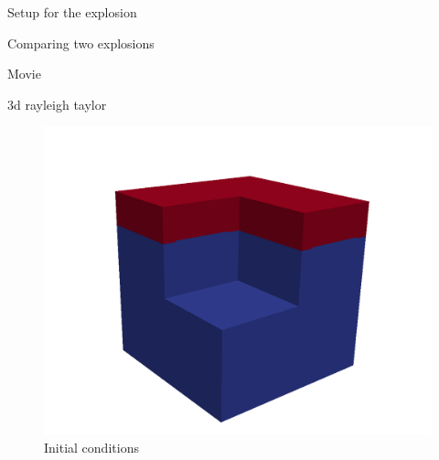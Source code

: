 \begin{frame}{Setup for the explosion}
\begin{minipage}{0.3\textwidth}
\begin{block}{}
\begin{figure}
        	  					\end{figure}
        	  		  	\end{block}
        	  	\end{minipage}
\end{frame}

\begin{frame}{Comparing two explosions}

Movie

\end{frame}


\begin{frame}{3d rayleigh taylor}

\vspace{2cm}
        	  	\begin{minipage}{0.49\textwidth}
        	  	\begin{block}{}
        	  				\vspace{-1.7cm}
        	  	     	  	\begin{figure}
        	  	     	  	      	  \centering
        	  	     	  	      	  \includegraphics[width=1.2\textwidth]{../../figs/rt3/fd3dinitw}
        	  	     	  	      	  \caption{Initial conditions}
        	  	     	  	 \end{figure}
        	  	\end{block}
        	  	\end{minipage}
        	  	\begin{minipage}{0.49\textwidth}
        	  			\begin{block}{}
        	  			\vspace{-1.7cm}

\end{block}
\end{minipage}
\end{frame}
